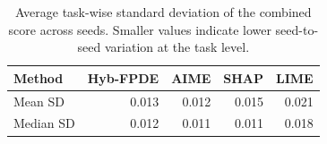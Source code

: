 \begin{table}[!tbp]
    \caption{Average task-wise standard deviation of the combined score across seeds. Smaller values indicate lower seed-to-seed variation at the task level.}
    \label{tab:taskwise_sd_summary}
    \centering
    \begin{tabular}{lrrrr}
        \toprule
        Method & Hyb-FPDE & AIME & SHAP & LIME  \\
        \midrule
        Mean SD & 0.013 & 0.012 & 0.015 & 0.021 \\
        Median SD & 0.012 & 0.011 & 0.011 & 0.018 \\
        \bottomrule
    \end{tabular}
\end{table}

